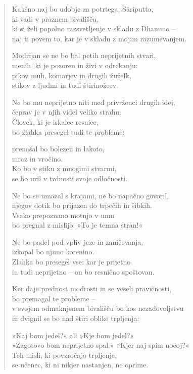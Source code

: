 \begin{verse}
Kakšno naj bo udobje za potrtega, Sāriputta,\\
ki vadi v praznem bivališču,\\
ki si želi popolno razsvetljenje v skladu z Dhammo --\\
naj ti povem to, kar je v skladu z mojim razumevanjem.

Modrijan se ne bo bal petih neprijetnih stvari,\\
menih, ki je pozoren in živi v odrekanju:\\
pikov muh, komarjev in drugih žuželk,\\
stikov z ljudmi in tudi štirinožcev.

Ne bo mu neprijetno niti med privrženci drugih idej,\\
čeprav je v njih videl veliko strahu.\\
Človek, ki je iskalec resnice,\\
bo zlahka presegel tudi te probleme:

prenašal bo bolezen in lakoto,\\
mraz in vročino.\\
Ko bo v stiku z mnogimi stvarmi,\\
se bo uril v trdnosti svoje odločnosti.

Ne bo se umazal s krajami, ne bo napačno govoril,\\
njegov dotik bo prijazen do trpečih in šibkih.\\
Vsako prepoznano motnjo v umu\\
bo pregnal z mislijo: »To je temna stran!«

Ne bo padel pod vpliv jeze in zaničevanja,\\
izkopal bo njuno korenino.\\
Zlahka bo presegel vse: kar je prijetno\\
in tudi neprijetno -- on bo resnično spoštovan.

Ker daje prednost modrosti in se veseli pravičnosti,\\
bo premagal te probleme --\\
v svojem odmaknjenem bivališču bo kos nezadovoljstvu\\
in dvignil se bo nad štiri oblike trpljenja:

»Kaj bom jedel?« ali »Kje bom jedel?«\\
»Zagotovo bom neprijetno spal.« »Kjer naj spim nocoj?«\\
Teh misli, ki povzročajo trpljenje,\\
se učenec, ki ni nikjer nastanjen, ne oprime.


\end{verse}
